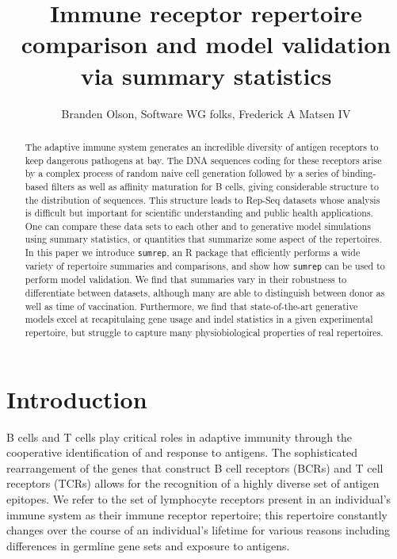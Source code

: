 \documentclass{article}
\title{Immune receptor repertoire comparison and model validation via summary statistics}
\author{Branden Olson, Software WG folks, Frederick A Matsen IV}
\begin{document}
\maketitle

\begin{abstract}
The adaptive immune system generates an incredible diversity of antigen receptors to keep dangerous pathogens at bay.
    The DNA sequences coding for these receptors arise by a complex process of random naive cell generation followed by a series of binding-based filters as well as affinity maturation for B cells, giving considerable structure to the distribution of sequences.
This structure leads to Rep-Seq datasets whose analysis is difficult but important for scientific understanding and public health applications.
One can compare these data sets to each other and to generative model simulations using summary statistics, or quantities that summarize some aspect of the repertoires.
In this paper we introduce \texttt{sumrep}, an R package that efficiently performs a wide variety of repertoire summaries and comparisons, and show how \texttt{sumrep} can be used to perform model validation.
We find that summaries vary in their robustness to differentiate between datasets, although many are able to distinguish between donor as well as time of vaccination.
Furthermore, we find that state-of-the-art generative models excel at recapitulaing gene usage and indel statistics in a given experimental repertoire, but struggle to capture many physiobiological properties of real repertoires.
\end{abstract}

\section*{Introduction}

B cells and T cells play critical roles in adaptive immunity through the cooperative identification of and response to antigens.
The sophisticated rearrangement of the genes that construct B cell receptors (BCRs) and T cell receptors (TCRs) allows for the recognition of a highly diverse set of antigen epitopes.
We refer to the set of lymphocyte receptors present in an individual's immune system as their immune receptor repertoire; this repertoire constantly changes over the course of an individual's lifetime for various reasons including differences in germline gene sets and exposure to antigens.
\end{document}
